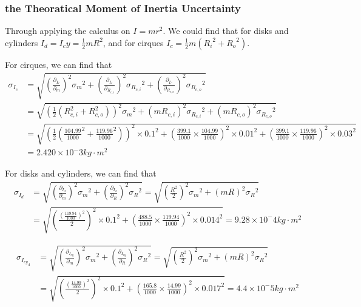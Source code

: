 \documentclass[12pt,a4paper]{article}
\begin{document}
\subsubsection{the Theoratical Moment of Inertia Uncertainty}
 
    Through applying the calculus on $I=mr^2$. We could find that for disks and cylinders $I_d=I_cy=\frac{1}{2}mR^2$, and for cirques $I_c=\frac{1}{2}m({R_i}^2+{R_o}^2)$.\par
    For cirques, we can find that
    $$
    \begin{aligned}
    \sigma_{I_c}&=\sqrt{(\frac{\partial_{I_c}}{\partial_m})^2{\sigma_m}^2+(\frac{\partial_{I_c}}{\partial_{R_{c,i}}})^2{\sigma_{R_{c,i}}}^2+(\frac{\partial_{I_c}}{\partial_{R_{c,o}}})^2{\sigma_{R_{c,o}}}^2}\\
    &=\sqrt{(\frac{1}{2}(R_{c,i}^2+R_{c,o}^2))^2{\sigma_m}^2+(mR_{c,i})^2{\sigma_{R_{c,i}}}^2+(mR_{c,o})^2{\sigma_{R_{c,o}}}^2}\\
    &=\sqrt{(\frac{1}{2}(\frac{104.99}{1000}^2+\frac{119.96}{1000}^2))^2\times{0.1}^2+(\frac{399.1}{1000}\times\frac{104.99}{1000})^2\times{0.01}^2+(\frac{399.1}{1000}\times\frac{119.96}{1000})^2\times{0.03}^2}\\
    &=2.420\times 10^-3 kg\cdot m^2
    \end{aligned}
    $$
    \par 

    For disks and cylinders, we can find that
    $$
    \begin{aligned}
    \sigma_{I_d}&=\sqrt{(\frac{\partial_{I_d}}{\partial_m})^2{\sigma_m}^2+(\frac{\partial_{I_d}}{\partial_R})^2{\sigma_R}^2}=\sqrt{(\frac{R^2}{2})^2{\sigma_m}^2+(mR)^2{\sigma_R}^2}\\
    &=\sqrt{(\frac{(\frac{119.94}{1000})^2}{2})^2\times{0.1}^2+(\frac{488.5}{1000}\times \frac{119.94}{1000})^2\times{0.014}^2}=9.28\times 10^-4kg\cdot m^2
    \end{aligned}
    $$ 

    $$
    \begin{aligned}
    \sigma_{I_{cy_A}}&=\sqrt{(\frac{\partial_{I_{cy}}}{\partial_m})^2{\sigma_m}^2+(\frac{\partial_{I_{cy}}}{\partial_R})^2{\sigma_R}^2}=\sqrt{(\frac{R^2}{2})^2{\sigma_m}^2+(mR)^2{\sigma_R}^2}\\
    &=\sqrt{(\frac{(\frac{14.99}{1000})^2}{2})^2\times{0.1}^2+(\frac{165.8}{1000}\times \frac{14.99}{1000})^2\times{0.017}^2}=4.4\times 10^-5kg\cdot m^2
    \end{aligned}
    $$ 
\end{document}
